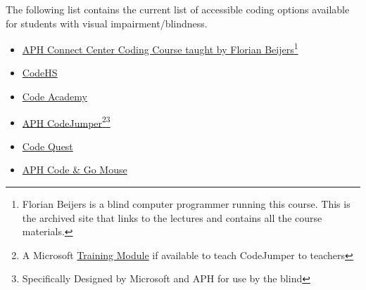 \pagebreak The following list contains the current list of accessible coding options available for students with visual impairment/blindness. 
\begin{itemize}[leftmargin=*]
	\item \href{https://zersiax.github.io/}{APH Connect Center Coding Course taught by Florian Beijers}\footnote{\raggedright Florian Beijers is a blind computer programmer running this course. This is the archived site that links to the lectures and contains all the course materials.}
	\item \href{https://codehs.com/}{CodeHS}
	\item \href{https://www.codecademy.com/}{Code Academy}
	\item \href{https://codejumper.com/}{APH CodeJumper}\footnote{\raggedright A Microsoft \href{https://docs.microsoft.com/en-us/learn/modules/code-jumper-inclusive-physical-coding-language/}{Training Module} if available to teach CodeJumper to teachers}\fnsep\footnote{\raggedright Specifically Designed by Microsoft and APH for use by the blind}
	\item \href{https://www.aph.org/product/code-quest-for-ipad-iphone/}{Code Quest}\footnotemark[\value{footnote}]
	\item \href{https://www.aph.org/product/accessible-code-and-go-mouse/}{APH Code \& Go Mouse}\footnotemark[\value{footnote}]
\end{itemize}